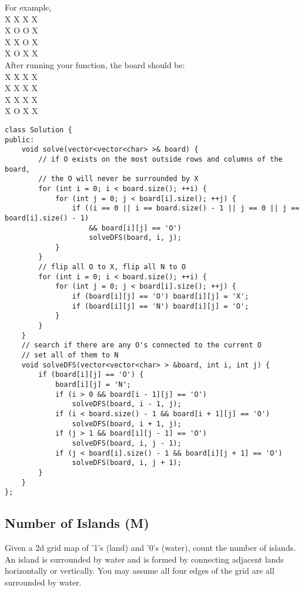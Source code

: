 For example,\\
X X X X\\
X O O X\\
X X O X\\
X O X X\\

After running your function, the board should be:\\
X X X X\\
X X X X\\
X X X X\\
X O X X\\

\begin{lstlisting}
class Solution {
public:
    void solve(vector<vector<char> >& board) {
        // if O exists on the most outside rows and columns of the board,
        // the O will never be surrounded by X
        for (int i = 0; i < board.size(); ++i) {
            for (int j = 0; j < board[i].size(); ++j) {
                if ((i == 0 || i == board.size() - 1 || j == 0 || j == board[i].size() - 1) 
                    && board[i][j] == 'O')
                    solveDFS(board, i, j);
            }
        }
        // flip all O to X, flip all N to O
        for (int i = 0; i < board.size(); ++i) {
            for (int j = 0; j < board[i].size(); ++j) {
                if (board[i][j] == 'O') board[i][j] = 'X';
                if (board[i][j] == 'N') board[i][j] = 'O';
            }
        }
    }
    // search if there are any O's connected to the current O
    // set all of them to N
    void solveDFS(vector<vector<char> > &board, int i, int j) {
        if (board[i][j] == 'O') {
            board[i][j] = 'N';
            if (i > 0 && board[i - 1][j] == 'O') 
                solveDFS(board, i - 1, j);
            if (i < board.size() - 1 && board[i + 1][j] == 'O') 
                solveDFS(board, i + 1, j);
            if (j > 1 && board[i][j - 1] == 'O') 
                solveDFS(board, i, j - 1);
            if (j < board[i].size() - 1 && board[i][j + 1] == 'O') 
                solveDFS(board, i, j + 1);
        }
    }
};
\end{lstlisting}


\subsection{Number of Islands (M)}
Given a 2d grid map of '1's (land) and '0's (water), count the number of islands. An island is surrounded by water and is formed by connecting adjacent lands horizontally or vertically. You may assume all four edges of the grid are all surrounded by water.\\

